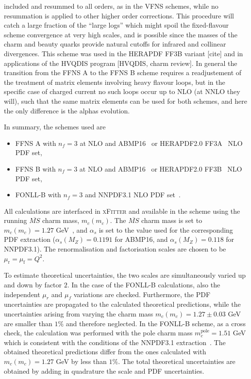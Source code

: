 \documentclass[pdftex,twocolumn,epjc3]{svjour3}          %
\newcommand{\abmp} {ABMP16\xspace}
\newcommand{\nnpdf} {NNPDF3.1\xspace}
\newcommand{\xfitter} {\textsc{xFitter}\xspace}
\newcommand{\fonll} {{FONLL-B}\xspace}
\newcommand{\ffns} {{FFNS A}\xspace}
\newcommand{\ffnsb} {{FFNS B}\xspace}
\newcommand{\ffthreea} {{HERAPDF2.0 FF3A}\xspace}
\newcommand{\ffthreeb} {{HERAPDF2.0 FF3B}\xspace}
\begin{document}
included and resummed to all orders, as in the VFNS schemes, while no 
resummation is applied to other higher order corrections. This procedure 
will catch a large fraction of the ``large logs'' which might spoil the 
fixed-flavour scheme convergence at very high scales, and is possible since the 
masses of the charm and beauty quarks provide natural cutoffs for infrared 
and collinear divergences. This scheme was used in the HERAPDF FF3B variant
[cite] and in applications of the HVQDIS program [HVQDIS, charm review]. 
In general the transition from the FFNS A to the
FFNS B scheme requires a readjustement of the treatment of matrix elements 
involving heavy flavour loops, but in the specific case of charged current 
no such loops occur up to NLO (at NNLO they will), such that the same 
matrix elements can be used for both schemes, and here the only difference is 
the alphas evolution.      
  
In summary, the schemes used are
\begin{itemize}
  \item \ffns with $n_f = 3$ at NLO and \abmp~\cite{Alekhin:2018pai} or \ffthreea~\cite{Abramowicz:2015mha} NLO PDF set,
  \item \ffnsb with $n_f = 3$ at NLO and \abmp~\cite{Alekhin:2018pai} or \ffthreeb~\cite{Abramowicz:2015mha} NLO PDF set,
  \item FONLL-B with $n_f = 3$ and \nnpdf NLO PDF set~\cite{Ball:2017nwa}.
\end{itemize}
All calculations are interfaced in \xfitter and available in the scheme using the running $\overline{MS}$ charm mass, $m_c(m_c)$.
The $\overline{MS}$ charm mass is set to $m_c(m_c) = 1.27$ GeV~\cite{pdg}, and $\alpha_s$ is set to the value used for the corresponding PDF extraction ($\alpha_s(M_Z) = 0.1191$ for \abmp, and $\alpha_s(M_Z) = 0.118$ for \nnpdf).
The renormalisation and factorisation scales are chosen to be $\mu_\mathrm{r} = \mu_\mathrm{f} = Q^2$.

To estimate theoretical uncertainties, the two scales are simultaneously varied up and down by factor $2$. In the case of the \fonll calculations, also the independent $\mu_r$ and $\mu_f$ variations are checked. Furthermore, the PDF uncertainties are propagated to the calculated theoretical predictions, while the uncertainties arising from varying the charm mass $m_c(m_c) = 1.27 \pm 0.03$ GeV are smaller than $1\%$ and therefore neglected. In the \fonll scheme, as a cross check, the calculation was performed with the pole charm mass $m_c^{\text{pole}} = 1.51$ GeV which is consistent with the conditions of the \nnpdf extraction~\cite{Ball:2017nwa}. The obtained theoretical predictions differ from the ones calculated with $m_c(m_c) = 1.27$ GeV by less than $1\%$.
The total theoretical uncertainties are obtained by adding in quadrature the scale and PDF uncertainties.
\end{document}
